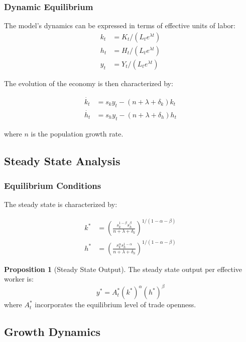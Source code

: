 \documentclass[12pt,a4paper]{article}
\theoremstyle{definition}
\newtheorem{proposition}{Proposition}
\begin{document}
\subsubsection{Dynamic Equilibrium}
The model's dynamics can be expressed in terms of effective units of labor:
\begin{align}
k_t &= K_t/(L_t e^{\lambda t}) \\
h_t &= H_t/(L_t e^{\lambda t}) \\
y_t &= Y_t/(L_t e^{\lambda t})
\end{align}

The evolution of the economy is then characterized by:

\begin{equation}
\begin{split}
\dot{k_t} &= s_k y_t - (n + \lambda + \delta_k)k_t \\
\dot{h_t} &= s_h y_t - (n + \lambda + \delta_h)h_t
\end{split}
\end{equation}

where $n$ is the population growth rate.

\subsection{Steady State Analysis}
\subsubsection{Equilibrium Conditions}
The steady state is characterized by:

\begin{equation}
\begin{split}
k^* &= \left(\frac{s_k^{1-\beta}s_h^\beta}{n + \lambda + \delta_k}\right)^{1/(1-\alpha-\beta)} \\
h^* &= \left(\frac{s_k^\alpha s_h^{1-\alpha}}{n + \lambda + \delta_h}\right)^{1/(1-\alpha-\beta)}
\end{split}
\end{equation}

\begin{proposition}[Steady State Output]
The steady state output per effective worker is:
\begin{equation}
y^* = A_t^* (k^*)^\alpha (h^*)^\beta
\end{equation}
where $A_t^*$ incorporates the equilibrium level of trade openness.
\end{proposition}

\subsection{Growth Dynamics}
\end{document}
